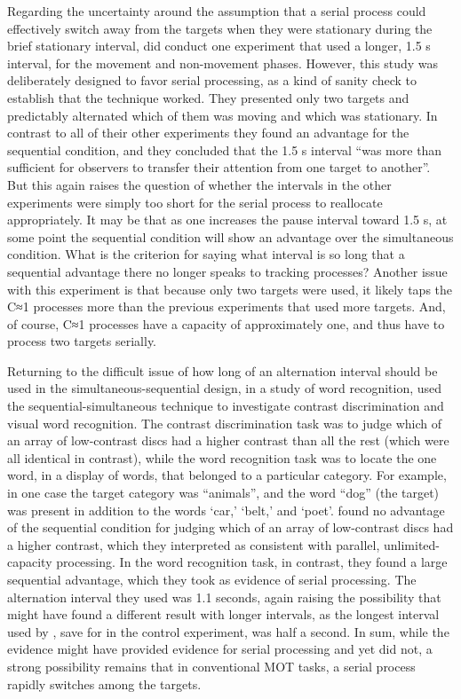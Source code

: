 \documentclass[
]{book}
\begin{document}
Regarding the uncertainty around the assumption that a serial process could effectively switch away from the targets when they were stationary during the brief stationary interval, \citet{howeDistinguishingParallelSerial2010} did conduct one experiment that used a longer, 1.5 s interval, for the movement and non-movement phases. However, this study was deliberately designed to favor serial processing, as a kind of sanity check to establish that the technique worked. They presented only two targets and predictably alternated which of them was moving and which was stationary. In contrast to all of their other experiments they found an advantage for the sequential condition, and they concluded that the 1.5 s interval ``was more than sufficient for observers to transfer their attention from one target to another''. But this again raises the question of whether the intervals in the other experiments were simply too short for the serial process to reallocate appropriately. It may be that as one increases the pause interval toward 1.5 s, at some point the sequential condition will show an advantage over the simultaneous condition. What is the criterion for saying what interval is so long that a sequential advantage there no longer speaks to tracking processes? Another issue with this experiment is that because only two targets were used, it likely taps the C≈1 processes more than the previous experiments that used more targets. And, of course, C≈1 processes have a capacity of approximately one, and thus have to process two targets serially.

Returning to the difficult issue of how long of an alternation interval should be used in the simultaneous-sequential design, in a study of word recognition, \citet{scharffExtendingSimultaneoussequentialParadigm2011} used the sequential-simultaneous technique to investigate contrast discrimination and visual word recognition. The contrast discrimination task was to judge which of an array of low-contrast discs had a higher contrast than all the rest (which were all identical in contrast), while the word recognition task was to locate the one word, in a display of words, that belonged to a particular category. For example, in one case the target category was ``animals'', and the word ``dog'' (the target) was present in addition to the words `car,' `belt,' and `poet'. \citet{scharffExtendingSimultaneoussequentialParadigm2011} found no advantage of the sequential condition for judging which of an array of low-contrast discs had a higher contrast, which they interpreted as consistent with parallel, unlimited-capacity processing. In the word recognition task, in contrast, they found a large sequential advantage, which they took as evidence of serial processing. The alternation interval they used was 1.1 seconds, again raising the possibility that \citet{howeDistinguishingParallelSerial2010} might have found a different result with longer intervals, as the longest interval used by \citet{howeDistinguishingParallelSerial2010}, save for in the control experiment, was half a second. In sum, while the \citet{howeDistinguishingParallelSerial2010} evidence might have provided evidence for serial processing and yet did not, a strong possibility remains that in conventional MOT tasks, a serial process rapidly switches among the targets.
\end{document}
